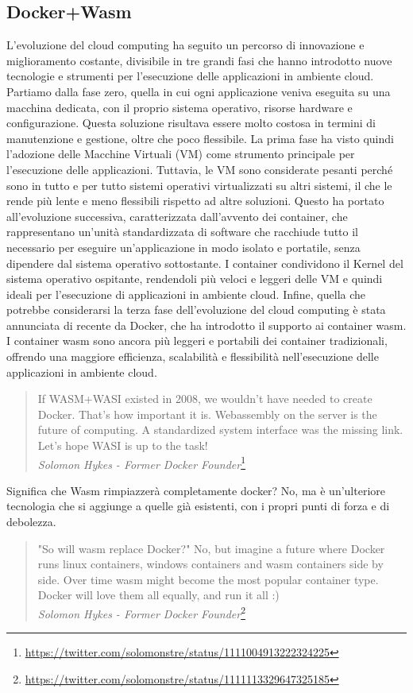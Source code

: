 \subsection{Docker+Wasm}
L'evoluzione del cloud computing ha seguito un percorso di innovazione e miglioramento costante, divisibile in tre
grandi fasi che hanno introdotto nuove tecnologie e strumenti per l'esecuzione delle applicazioni in ambiente cloud.
Partiamo dalla fase zero, quella in cui ogni applicazione veniva eseguita su una macchina dedicata, con il proprio
sistema operativo, risorse hardware e configurazione. Questa soluzione risultava essere molto costosa in termini di
manutenzione e gestione, oltre che poco flessibile. La prima fase ha visto quindi l'adozione delle Macchine Virtuali
(VM) come strumento principale per l'esecuzione delle applicazioni. Tuttavia, le VM sono considerate pesanti perché sono
in tutto e per tutto sistemi operativi virtualizzati su altri sistemi, il che le rende più lente e meno flessibili
rispetto ad altre soluzioni. Questo ha portato all'evoluzione successiva, caratterizzata dall'avvento dei container, che
rappresentano un'unità standardizzata di software che racchiude tutto il necessario per eseguire un'applicazione in modo
isolato e portatile, senza dipendere dal sistema operativo sottostante. I container condividono il Kernel del sistema
operativo ospitante, rendendoli più veloci e leggeri delle VM e quindi ideali per l'esecuzione di applicazioni in
ambiente cloud. Infine, quella che potrebbe considerarsi la terza fase dell'evoluzione del cloud computing è stata
annunciata di recente da Docker, che ha introdotto il supporto ai container wasm\cite{docker-wasm-tech-preview}. I
container wasm sono ancora più leggeri e portabili dei container tradizionali, offrendo una maggiore efficienza,
scalabilità e flessibilità nell'esecuzione delle applicazioni in ambiente cloud.
\begin{quote}
    If WASM+WASI existed in 2008, we wouldn't have needed to create Docker. That's how important it is. Webassembly on
    the server is the future of computing. A standardized system interface was the missing link. Let's hope WASI is up
    to the task! \\
    \textit{Solomon Hykes - Former Docker
    Founder}\footnote{\url{https://twitter.com/solomonstre/status/1111004913222324225}}
\end{quote}

Significa che Wasm rimpiazzerà completamente docker? No, ma è un'ulteriore tecnologia che si aggiunge a quelle già
esistenti, con i propri punti di forza e di debolezza.
\begin{quote}
    "So will wasm replace Docker?" No, but imagine a future where Docker runs linux containers, windows containers and
    wasm containers side by side. Over time wasm might become the most popular container type. Docker will love them all
    equally, and run it all :) \\
    \textit{Solomon Hykes - Former Docker
    Founder}\footnote{\url{https://twitter.com/solomonstre/status/1111113329647325185}}
\end{quote}
